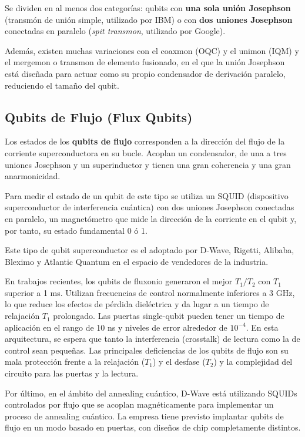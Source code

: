 Se dividen en al menos dos categorías: qubits con \textbf{una sola unión Josephson} (transmón de unión simple, utilizado por IBM) o con \textbf{dos uniones Josephson} conectadas en paralelo (\textit{spit transmon}, utilizado por Google). 

Además, existen muchas variaciones con el coaxmon (OQC) y el unimon (IQM) y el mergemon o transmon de elemento fusionado, en el que la unión Josephson está diseñada para actuar como su propio condensador de derivación paralelo, reduciendo el tamaño del qubit.


\subsection{Qubits de Flujo (Flux Qubits)}

Los estados de los \textbf{qubits de flujo} corresponden a la dirección del flujo de la corriente superconductora en su bucle. Acoplan un condensador, de una a tres uniones Josephson y un superinductor y tienen una gran coherencia y una gran anarmonicidad.

Para medir el estado de un qubit de este tipo se utiliza un SQUID (dispositivo superconductor de interferencia cuántica) con dos uniones Josephson conectadas en paralelo, un magnetómetro que mide la dirección de la corriente en el qubit y, por tanto, su estado fundamental 0 ó 1.

Este tipo de qubit superconductor es el adoptado por D-Wave, Rigetti, Alibaba, Bleximo y Atlantic Quantum en el espacio de vendedores de la industria.

En trabajos recientes, los qubits de fluxonio generaron el mejor $T_1 /T_2$ con $T_1$ superior a 1 ms. Utilizan frecuencias de control normalmente inferiores a 3 GHz, lo que reduce los efectos de pérdida dieléctrica y da lugar a un tiempo de relajación $T_1$ prolongado. Las puertas single-qubit pueden tener un tiempo de aplicación en el rango de 10 ns y niveles de error alrededor de $10^{-4}$. En esta arquitectura, se espera que tanto la interferencia (crosstalk) de lectura como la de control sean pequeñas. Las principales deficiencias de los qubits de flujo son su mala protección frente a la relajación ($T_1$) y el desfase ($T_2$) y la complejidad del circuito para las puertas y la lectura.

Por último, en el ámbito del annealing cuántico, D-Wave está utilizando SQUIDs controlados por flujo que se acoplan magnéticamente para implementar un proceso de annealing cuántico. La empresa tiene previsto implantar qubits de flujo en un modo basado en puertas, con diseños de chip completamente distintos.


